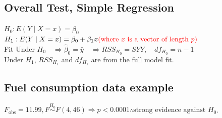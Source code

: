 \documentclass[14pt]{extarticle}
\begin{document}
\subsection*{Overall Test, Simple Regression}

\noindent
$H_0: E(Y \mid X = x) = \beta_0$\\
$H_1: E(Y \mid X = x) = \beta_0 + \beta_1 x \textcolor{red}{\text{(where } x \text{ is a vector of length } p)}$\\
Fit Under $H_0 \quad \Rightarrow \hat{\beta}_0 = \bar{y} \quad \Rightarrow RSS_{H_0} = SYY , \quad df_{H_0} = n - 1$\\
Under $H_1$, $RSS_{H_1}$ and $df_{H_1}$ are from the full model fit.

\subsection*{Fuel consumption data example}
$F_{\text{obs}} = 11.99, F \overset{H_0}{\sim} F(4, 46) \Rightarrow p < 0.0001 \therefore \text{strong evidence against } H_0$. 
\end{document}
